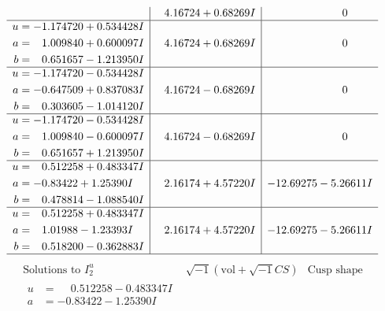 \documentclass[1p]{elsarticle_modified}
\theoremstyle{definition}
\newcommand{\I}{\sqrt{-1}}
\begin{document}
$$\begin{array}{c|c|c}
 & \phantom{-}4.16724 + 0.68269 I & \phantom{-0.000000 } 0 \\ \hline\begin{aligned}
u &= -1.174720 + 0.534428 I \\
a &= \phantom{-}1.009840 + 0.600097 I \\
b &= \phantom{-}0.651657 - 1.213950 I\end{aligned}
 & \phantom{-}4.16724 + 0.68269 I & \phantom{-0.000000 } 0 \\ \hline\begin{aligned}
u &= -1.174720 - 0.534428 I \\
a &= -0.647509 + 0.837083 I \\
b &= \phantom{-}0.303605 - 1.014120 I\end{aligned}
 & \phantom{-}4.16724 - 0.68269 I & \phantom{-0.000000 } 0 \\ \hline\begin{aligned}
u &= -1.174720 - 0.534428 I \\
a &= \phantom{-}1.009840 - 0.600097 I \\
b &= \phantom{-}0.651657 + 1.213950 I\end{aligned}
 & \phantom{-}4.16724 - 0.68269 I & \phantom{-0.000000 } 0 \\ \hline\begin{aligned}
u &= \phantom{-}0.512258 + 0.483347 I \\
a &= -0.83422 + 1.25390 I \\
b &= \phantom{-}0.478814 - 1.088540 I\end{aligned}
 & \phantom{-}2.16174 + 4.57220 I & -12.69275 - 5.26611 I \\ \hline\begin{aligned}
u &= \phantom{-}0.512258 + 0.483347 I \\
a &= \phantom{-}1.01988 - 1.23393 I \\
b &= \phantom{-}0.518200 - 0.362883 I\end{aligned}
 & \phantom{-}2.16174 + 4.57220 I & -12.69275 - 5.26611 I\\
 \hline 
 \end{array}$$\newpage$$\begin{array}{c|c|c}  
\text{Solutions to }I^u_{2}& \I (\text{vol} + \sqrt{-1}CS) & \text{Cusp shape}\\
 \hline 
\begin{aligned}
u &= \phantom{-}0.512258 - 0.483347 I \\
a &= -0.83422 - 1.25390 I \\

\end{aligned}
\end{array}$$
\end{document}
